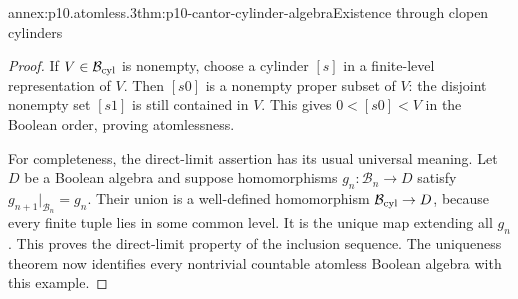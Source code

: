 \begin{annexitem}{annex:p10.atomless.3}{thm:p10-cantor-cylinder-algebra}{Existence through clopen cylinders}
\begin{proof}
If \(V\in\mathcal B_{\rm cyl}\) is nonempty, choose a cylinder
\([s]\) in a finite-level representation of \(V\).
Then \([s0]\) is a nonempty proper subset of \(V\):
the disjoint nonempty set \([s1]\) is still contained in \(V\).
This gives \(0<[s0]<V\) in the Boolean order, proving atomlessness.

For completeness, the direct-limit assertion has its usual
universal meaning.  Let \(D\) be a Boolean algebra and suppose homomorphisms
\(g_n:\mathcal B_n\to D\) satisfy
\(g_{n+1}|_{\mathcal B_n}=g_n\).
Their union is a well-defined homomorphism
\(\mathcal B_{\rm cyl}\to D\), because every finite tuple
lies in some common level.
It is the unique map extending all \(g_n\).
This proves the direct-limit property of the inclusion sequence.
The uniqueness theorem now identifies every nontrivial countable
atomless Boolean algebra with this example.
\end{proof}
\end{annexitem}

